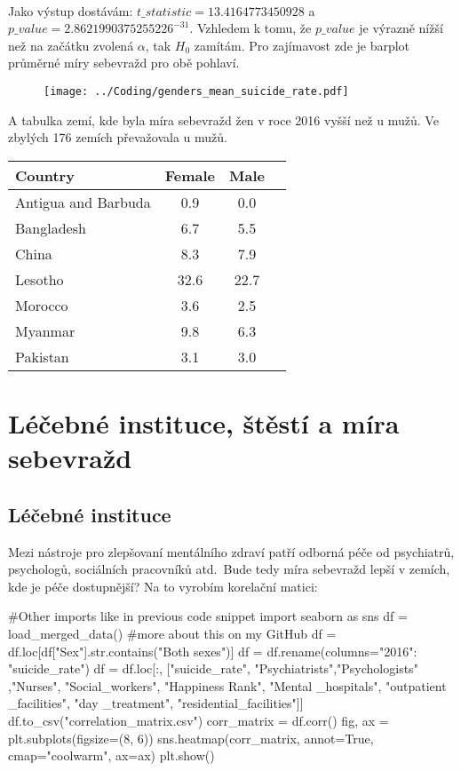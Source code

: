 \documentclass[12pt]{article}
\begin{document}
\paragraph{}
Jako výstup dostávám: $t\_statistic = 13.4164773450928$ a $p\_value = 2.8621990375255226^{-31}$. Vzhledem k tomu, že $p\_value$ je výrazně nížší než na začátku zvolená $\alpha$, tak $H_0$ zamítám. Pro zajímavost zde je barplot průměrné míry sebevražd pro obě pohlaví. 
\begin{figure}[hbt]
  \centering
  \texttt{[image: ../Coding/genders\_mean\_suicide\_rate.pdf]}
  \label{fig:plot}
\end{figure}

\newpage
A tabulka zemí, kde byla míra sebevražd žen v roce 2016 vyšší než u mužů. Ve zbylých 176 zemích převažovala u mužů.
\begin{table}[htb]
\centering
\label{tab:suicide-rates}
\begin{tabular}{lccc}
\hline
Country & Female & Male \\
\hline
Antigua and Barbuda & 0.9 & 0.0 \\
Bangladesh & 6.7 & 5.5 \\
China & 8.3 & 7.9 \\
Lesotho & 32.6 & 22.7 \\
Morocco & 3.6 & 2.5 \\
Myanmar & 9.8 & 6.3 \\
Pakistan & 3.1 & 3.0 \\
\hline
\end{tabular}
\end{table}

\newpage
\section{Léčebné instituce, štěstí a míra sebevražd}
\subsection{Léčebné instituce}
	Mezi nástroje pro zlepšovaní mentálního zdraví patří odborná péče od psychiatrů, psychologů, sociálních pracovníků atd.\ Bude tedy míra sebevražd lepší v zemích, kde je péče dostupnější? Na to vyrobím korelační matici: \\

\begin{python}
#Other imports like in previous code snippet
import seaborn as sns
df = load_merged_data() #more about this on my GitHub
df = df.loc[df["Sex"].str.contains("Both sexes")]
df = df.rename(columns={"2016": "suicide_rate"})
df = df.loc[:, ["suicide_rate", "Psychiatrists","Psychologists" ,"Nurses", "Social_workers", "Happiness Rank", "Mental _hospitals", "outpatient _facilities", "day _treatment", "residential_facilities"]]
df.to_csv("correlation_matrix.csv")
corr_matrix = df.corr()
fig, ax = plt.subplots(figsize=(8, 6))
sns.heatmap(corr_matrix, annot=True, cmap="coolwarm", ax=ax)
plt.show()
\end{python}
\end{document}

